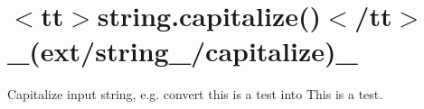 \chapter{\texorpdfstring{$<$}{<}tt\texorpdfstring{$>$}{>}string.\+capitalize()\texorpdfstring{$<$}{<}/tt\texorpdfstring{$>$}{>} \+\_\+(ext/string\+\_\+/capitalize)\+\_\+}
\hypertarget{md__2home_2solype_2delivery_2current__days_2Mannheim_2front_2node__modules_2ext_2docs_2string___2capitalize}{}\label{md__2home_2solype_2delivery_2current__days_2Mannheim_2front_2node__modules_2ext_2docs_2string___2capitalize}
\label{md__2home_2solype_2delivery_2current__days_2Mannheim_2front_2node__modules_2ext_2docs_2string___2capitalize_autotoc_md2582}%
%
 Capitalize input string, e.\+g. convert {\ttfamily this is a test} into {\ttfamily This is a test}.


\begin{DoxyCode}{0}
\DoxyCodeLine{}

\end{DoxyCode}
 